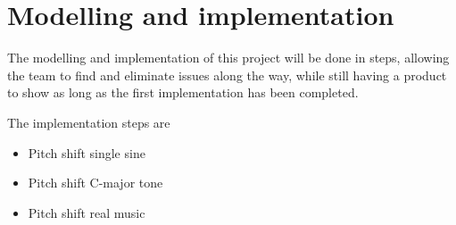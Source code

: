 
\section{Modelling and implementation}
\label{sec:modelandimpl}
The modelling and implementation of this project will be done in steps, allowing the team to find and eliminate issues along the way, while still having a product to show as long as the first implementation has been completed.

The implementation steps are
\begin{itemize}
	\item Pitch shift single sine
	\item Pitch shift C-major tone
	\item Pitch shift real music
\end{itemize}